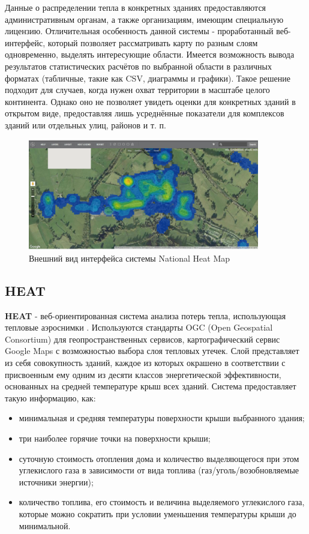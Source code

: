  	Данные о распределении тепла в конкретных зданиях предоставляются административным органам, а также организациям, имеющим специальную лицензию. Отличительная особенность данной системы - проработанный веб-интерфейс, который позволяет рассматривать карту по разным слоям одновременно, выделять интересующие области. Имеется возможность вывода результатов статистических расчётов по выбранной области в различных форматах (табличные, такие как {CSV}, диаграммы и графики). Такое решение подходит для случаев, когда нужен охват территории в масштабе целого континента. Однако оно не позволяет увидеть оценки для конкретных зданий в открытом виде, предоставляя лишь усреднённые показатели для комплексов зданий или отдельных улиц, районов и т. п.

 	\begin{figure}[h!]
      \centering
      \includegraphics[width=0.9\textwidth]{images/screens/1_nhm.png}
      \caption{Внешний вид интерфейса системы National Heat Map}
      \label{screens:nhm}
    \end{figure}

\subsection{HEAT}

\par
	\textbf{HEAT} - веб-ориентированная система анализа потерь тепла, использующая тепловые аэроснимки \cite{problem:heat}. Используются стандарты {OGC} (Open Geospatial Consortium) для геопространственных сервисов, картографический сервис {Google Maps} с возможностью выбора слоя тепловых утечек. Слой представляет из себя совокупность зданий, каждое из которых окрашено в соответствии с присвоенным ему одним из десяти классов энергетической эффективности, основанных на средней температуре крыш всех зданий. Система предоставляет такую информацию, как:

	\begin{itemize}
		\item минимальная и средняя температуры поверхности крыши выбранного здания;
		\item три наиболее горячие точки на поверхности крыши;
		\item суточную стоимость отопления дома и количество выделяющегося при этом углекислого газа в зависимости от вида топлива (газ/уголь/возобновляемые источники энергии);
		\item количество топлива, его стоимость и величина выделяемого углекислого газа, которые можно сократить при условии уменьшения температуры крыши до минимальной.
	\end{itemize}

